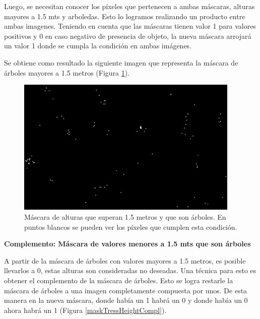 \documentclass[10pt,a4paper, twoside]{report}
\begin{document}
Luego, se necesitan conocer los píxeles que pertenecen a ambas máscaras, alturas mayores a 1.5 mts y arboledas. Esto lo logramos realizando un producto entre ambas imagenes. Teniendo en cuenta que las máscaras tienen valor 1 para valores positivos y 0 en caso negativo de presencia de objeto, la nueva máscara arrojará un valor 1 donde se cumpla la condición en ambas imágenes.

Se obtiene como resultado la siguiente imagen que representa la máscara de árboles mayores a 1.5 metros (Figura \ref{maskTressHeight}).

\begin{figure}[H]
   \centering      
   \includegraphics[width=0.95\textwidth]{imagenes/maskTressHeight.jpg}
 \caption{Máscara de alturas que superan 1.5 metros y que son árboles. En puntos blancos se pueden ver los píxeles que cumplen esta condición.}
 \label{maskTressHeight}
\end{figure}

\textbf{Complemento: Máscara de valores menores a 1.5 mts que son árboles}

A partir de la máscara de árboles con valores mayores a 1.5 metros, es posible llevarlos a 0, estas alturas son consideradas no deseadas. Una técnica para esto es obtener el complemento de la máscara de árboles. Esto se logra restarle la máscara de árboles a una imagen completamente compuesta por unos. De esta manera en la nueva máscara, donde había un 1 habrá un 0 y donde había un 0 ahora habrá un 1 (Figura \ref{maskTressHeightCompl}).
\end{document}
